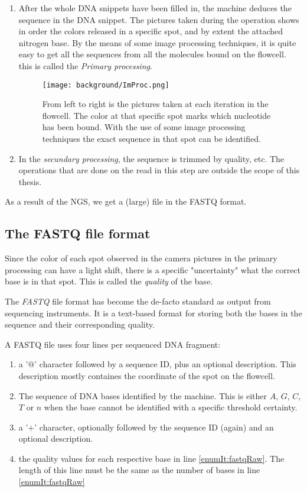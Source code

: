 \begin{enumerate}
	\item After the whole DNA snippets have been filled in, the machine deduces the sequence in the DNA snippet. The pictures taken during the operation shows in order the colors released in a specific spot, and by extent the attached nitrogen base. By the means of some image processing techniques, it is quite easy to get all the sequences from all the molecules bound on the flowcell. this is called the \emph{Primary processing}.
	
	\begin{figure}[H]
		\centering
		\texttt{[image: background/ImProc.png]}
		\caption{From left to right is the pictures taken at each iteration in the flowcell. The color at that specific spot marks which nucleotide has been bound. With the use of some image processing techniques the exact sequence in that spot can be identified.}
		\label{fig:ImProc}
	\end{figure}
	
	\item In the \emph{secundary processing}, the sequence is trimmed by quality, etc. The operations that are done on the read in this step are outside the scope of this thesis.
\end{enumerate}

As a result of the NGS, we get a (large) file in the FASTQ format.

\subsection{The FASTQ file format}

Since the color of each spot observed in the camera pictures in the primary processing can have a light shift, there is a specific "uncertainty" what the correct base is in that spot. This is called the \emph{quality} of the base.

The \emph{FASTQ} file format has become the de-facto standard as output from sequencing instruments. It is a text-based format for storing both the bases in the sequence and their corresponding quality.

A FASTQ file uses four lines per sequenced DNA fragment:

\begin{enumerate}
	\item a '$@$' character followed by a sequence ID, plus an optional description. This description mostly containes the coordinate of the spot on the flowcell.
	\item \label{enumIt:fastqRaw} The sequence of DNA bases identified by the machine. This is either $A$, $G$, $C$, $T$ or $n$ when the base cannot be identified with a specific threshold certainty.
	\item a '$+$' character, optionally followed by the sequence ID (again) and an optional description.
	\item the quality values for each respective base in line \ref{enumIt:fastqRaw}. The length of this line must be the same as the number of bases in line \ref{enumIt:fastqRaw}
\end{enumerate}


